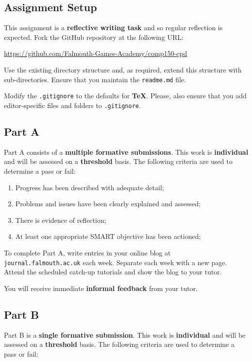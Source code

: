 \documentclass{../../fal_assignment}
\begin{document}
\subsection*{Assignment Setup}

This assignment is a \textbf{reflective writing task} and so regular reflection is expected. Fork the GitHub repository at the following URL:

\indent \url{https://github.com/Falmouth-Games-Academy/comp150-cpd}

Use the existing directory structure and, as required, extend this structure with sub-directories. Ensure that you maintain the \texttt{readme.md} file. 

Modify the \texttt{.gitignore} to the defaults for \textbf{TeX}. Please, also ensure that you add editor-specific files and folders to \texttt{.gitignore}. 

\subsection*{Part A}

Part A consists of a \textbf{multiple formative submissions}. This work is \textbf{individual} and will be assessed on a \textbf{threshold} basis. The following criteria are used to determine a pass or fail:

\begin{enumerate}[label=(\alph*)]
	\item Progress has been described with adequate detail;
	\item Problems and issues have been clearly explained and assessed;
	\item There is evidence of reflection;
	\item At least one appropriate SMART objective has been actioned;
\end{enumerate}

To complete Part A, write entries in your online blog at \texttt{journal.falmouth.ac.uk} each week. Separate each week with a new page. Attend the scheduled catch-up tutorials and show the blog to your tutor. 

You will receive immediate \textbf{informal feedback} from your tutor.

\subsection*{Part B}

Part B is a \textbf{single formative submission}. This work is \textbf{individual} and will be assessed on a \textbf{threshold} basis. The following criteria are used to determine a pass or fail:
\end{document}

